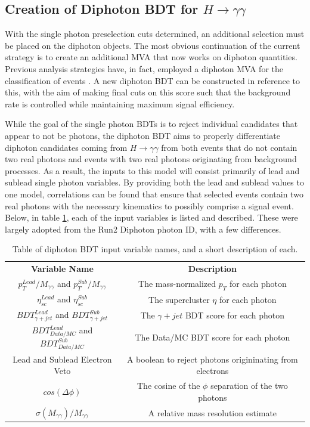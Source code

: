 \documentclass[12pt]{ucsddissertation}
\begin{document}
\subsection{Creation of Diphoton BDT for $H \rightarrow \gamma \gamma$}\label{sec:DiphotonBDT}
With the single photon preselection cuts determined, an additional selection must be placed on the diphoton objects. The most obvious continuation of the current strategy is to create an additional MVA that now works on diphoton quantities. Previous analysis strategies have, in fact, employed a diphoton MVA for the classification of events \cite{Run2Hgg2018}. A new diphoton BDT can be constructed in reference to this, with the aim of making final cuts on this score such that the background rate is controlled while maintaining maximum signal efficiency.

While the goal of the single photon BDTs is to reject individual candidates that appear to not be photons, the diphoton BDT aims to properly differentiate diphoton candidates coming from $H \rightarrow \gamma \gamma$ from both events that do not contain two real photons and events with two real photons originating from background processes. As a result, the inputs to this model will consist primarily of lead and sublead single photon variables. By providing both the lead and sublead values to one model, correlations can be found that ensure that selected events contain two real photons with the necessary kinematics to possibly comprise a signal event. Below, in table \ref{tab:DiphotonBDTInputs}, each of the input variables is listed and described. These were largely adopted from the Run2 Diphoton photon ID, with a few differences. 
\begin{table}
	\centering
	\caption{Table of diphoton BDT input variable names, and a short description of each.}
	\label{tab:DiphotonBDTInputs}
	\begin{tabular}{ | c | c | } 
		\hline
		\textbf{Variable Name} & \textbf{Description} \\
		\Xhline{2pt}
	  	$p^{Lead}_{T}/M_{\gamma \gamma}$ and $p^{Sub}_{T}/M_{\gamma \gamma}$ & The mass-normalized $p_T$ for each photon \\ 
		\hline
		$\eta^{Lead}_{sc}$ and $\eta^{Sub}_{sc}$ & The supercluster $\eta$ for each photon  \\ 
		\hline
		$BDT^{Lead}_{\gamma + jet}$ and $BDT^{Sub}_{\gamma + jet}$& The $\gamma + jet$ BDT score for each photon\\ 
		\hline
		$BDT^{Lead}_{Data/MC}$ and $BDT^{Sub}_{Data/MC}$& The Data/MC BDT score for each photon\\ 
		\hline
		Lead and Sublead Electron Veto &  A boolean to reject photons origininating from electrons\\ 
		\hline
		$cos(\Delta \phi)$ &  The cosine of the $\phi$ separation of the two photons \\ 
		\hline
		$\sigma(M_{\gamma \gamma})/M_{\gamma \gamma}$ & A relative mass resolution estimate \\ 
		\hline
	\end{tabular}
\end{table}
\end{document}
